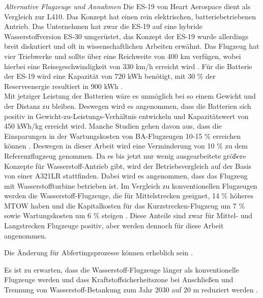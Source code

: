 \textit{Alternative Flugzeuge und Annahmen}
Die ES-19 von Heart Aerospace dient als Vergleich zur L410. Das Konzept hat einen rein elektrischen, batteriebetriebenen Antrieb.
Das Unternehmen hat zwar die ES-19 auf eine hybride Wasserstoffversion ES-30 umgerüstet, das Konzept der ES-19 wurde allerdings breit diskutiert 
und oft in wissenschaftlichen Arbeiten erwähnt. Das Flugzeug hat vier Triebwerke und sollte über eine Reichweite von 400 km verfügen, 
wobei hierbei eine Reisegeschwindigkeit von 330 km/h erreicht wird \cite{anker2023feasibility} \cite{heart_aerospace_es19}.
Für die Batterie der ES-19 wird eine Kapazität von 720 kWh benötigt, mit 30 \% der Reserveenergie resultiert in 900 kWh \cite{donckers2024electric}. \\
Mit jetziger Leistung der Batterien wäre es unmöglich bei so einem Gewicht und der Distanz zu bleiben.
Deswegen wird es angenommen, dass die Batterien sich positiv in Gewicht-zu-Leistungs-Verhältnis entwickeln und Kapazitätswert von 450 kWh/kg erreicht wird.
Manche Studien gehen davon aus, dass die Einsparungen in der Wartungskosten von BA-Flugzeugen 10-15 \% erreichen können 
\cite{wangsness2021fremskyndet,avogadro2024demystifying}. 
Deswegen in dieser Arbeit wird eine Verminderung von 10 \% zu dem Referenzflugzeug genommen.
%
Da es bis jetzt nur wenig ausgearbeitete größere Konzepte für Wasserstoff-Antrieb gibt, wird der Betriebsvergleich
auf der Basis von einer A321LR stattfinden. Dabei wird es angenommen, dass das Flugzeug mit Wasserstoffturbine betrieben ist.
Im Vergleich zu konventionellen Flugzeugen werden die Wasserstoff-Flugzeuge, die für Mittelstrecken geeignet, 14 \% höheres MTOW haben 
und die Kapitalkosten für das Kurzstrecken-Flugzeug um 7 \% sowie Wartungskosten um 6 \% steigen \cite{sky2020hydrogen}. 
Diese Anteile sind zwar für Mittel- und Langstrecken Flugzeuge positiv, aber werden dennoch für diese Arbeit angenommen.

Die Änderung für Abfertingsprozesse können erheblich sein \cite{ati_hydrogen_infrastructure}. 

Es ist zu erwarten, dass die Wasserstoff-Flugzeuge länger als konventionelle Flugzeuge werden
und dass Kraftstoffsicherheitszone bei Anschließen und Trennung von Wasserstoff-Betankung zum Jahr 2030 auf 20 m reduziert werden \cite{hoelzen2022h2}.

